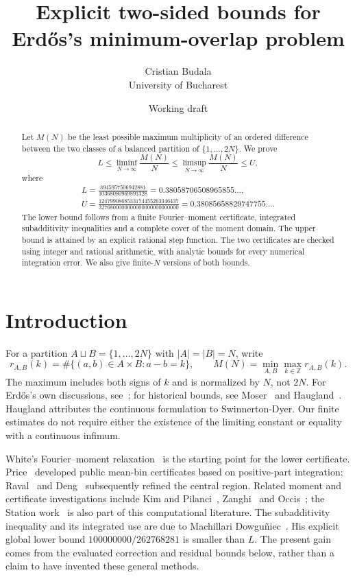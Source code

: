 \documentclass[10pt]{article}
\title{Explicit two-sided bounds for Erd\H{o}s's minimum-overlap problem}
\author{Cristian Budala\\\small University of Bucharest}
\date{Working draft}
\newcommand{\Z}{\mathbb Z}
\begin{document}
\maketitle
\begin{abstract}
Let $M(N)$ be the least possible maximum multiplicity of an ordered difference between the two classes of a balanced partition of $\{1,\ldots,2N\}$.
We prove
\[
L\leq\liminf_{N\to\infty}\frac{M(N)}N
\leq\limsup_{N\to\infty}\frac{M(N)}N\leq U,
\]
where
\begin{gather*}
L=\frac{3945957506942881}{10368080969891328}
 =0.38058706508965855\ldots,\\
U=\frac{1247990868533174455263346437}{3276800000000000000000000000}
 =0.38085658829747755\ldots.
\end{gather*}
The lower bound follows from a finite Fourier--moment certificate, integrated subadditivity inequalities and a complete cover of the moment domain.
The upper bound is attained by an explicit rational step function.
The two certificates are checked using integer and rational arithmetic, with analytic bounds for every numerical integration error. We also give finite-$N$ versions of both bounds.
\end{abstract}

\section{Introduction}
For a partition $A\sqcup B=\{1,\ldots,2N\}$ with $|A|=|B|=N$, write
\[
r_{A,B}(k)=\#\{(a,b)\in A\times B:a-b=k\},\qquad
M(N)=\min_{A,B}\max_{k\in\Z}r_{A,B}(k).
\]
The maximum includes both signs of $k$ and is normalized by $N$, not $2N$.
For Erd\H{o}s's own discussions, see~\cite{Erdos1955,Erdos1956,Erdos1961,Erdos1992}; for historical bounds, see Moser~\cite{Moser} and Haugland~\cite{Haugland1996,Haugland2016}.
Haugland attributes the continuous formulation to Swinnerton-Dyer.
Our finite estimates do not require either the existence of the limiting constant or equality with a continuous infimum.

White's Fourier--moment relaxation~\cite{White} is the starting point for the lower certificate. Price~\cite{Price} developed public mean-bin certificates based on positive-part integration; Raval~\cite{Raval} and Deng~\cite{Deng} subsequently refined the central region. Related moment and certificate investigations include Kim and Pilanci~\cite{KimPilanci}, Zanghi~\cite{Zanghi} and Occis~\cite{Occis}; the Station work~\cite{Station} is also part of this computational literature.
The subadditivity inequality and its integrated use are due to Machillari Dowgu\~niec~\cite{Machillari}. His explicit global lower bound $100000000/262768281$ is smaller than $L$.
The present gain comes from the evaluated correction and residual bounds below, rather than a claim to have invented these general methods.
\end{document}
